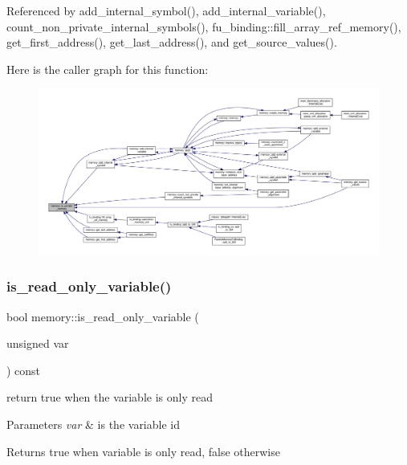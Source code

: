 Referenced by add\+\_\+internal\+\_\+symbol(), add\+\_\+internal\+\_\+variable(), count\+\_\+non\+\_\+private\+\_\+internal\+\_\+symbols(), fu\+\_\+binding\+::fill\+\_\+array\+\_\+ref\+\_\+memory(), get\+\_\+first\+\_\+address(), get\+\_\+last\+\_\+address(), and get\+\_\+source\+\_\+values().

Here is the caller graph for this function\+:
\nopagebreak
\begin{figure}[H]
\begin{center}
\leavevmode
\includegraphics[width=350pt]{d8/d99/classmemory_a3f36ef4c278bf2a45a2834523c484c7f_icgraph}
\end{center}
\end{figure}
\mbox{\label{classmemory_a95592389e09c170738164d64ef46aacb}} 
\subsubsection{\texorpdfstring{is\+\_\+read\+\_\+only\+\_\+variable()}{is\_read\_only\_variable()}}
{\footnotesize\ttfamily bool memory\+::is\+\_\+read\+\_\+only\+\_\+variable (\begin{DoxyParamCaption}\item[{unsigned}]{var }\end{DoxyParamCaption}) const}



return true when the variable is only read 


\begin{DoxyParams}{Parameters}
{\em var} & is the variable id \\
\hline
\end{DoxyParams}
\begin{DoxyReturn}{Returns}
true when variable is only read, false otherwise 
\end{DoxyReturn}


